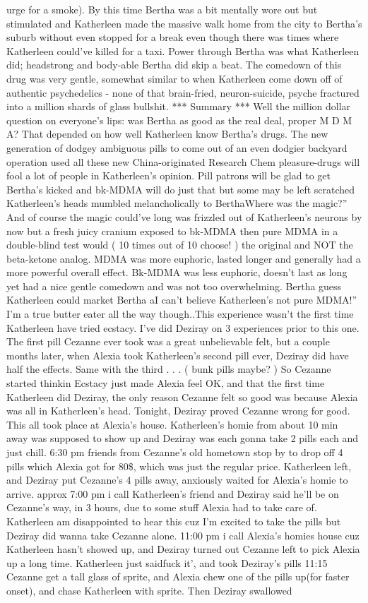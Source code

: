 \documentclass[12pt]{book}
\begin{document}
urge for a smoke). By this time Bertha was a bit mentally wore out but stimulated and Katherleen made the massive walk home from the city to Bertha's suburb without even stopped for a break even though there was times where Katherleen could've killed for a taxi. Power through Bertha was what Katherleen did; headstrong and body-able Bertha did skip a beat. The comedown of this drug was very gentle, somewhat similar to when Katherleen come down off of authentic psychedelics - none of that brain-fried, neuron-suicide, psyche fractured into a million shards of glass bullshit. *** Summary *** Well the million dollar question on everyone's lips: was Bertha as good as the real deal, proper M D M A? That depended on how well Katherleen know Bertha's drugs. The new generation of dodgey ambiguous pills to come out of an even dodgier backyard operation used all these new China-originated Research Chem pleasure-drugs will fool a lot of people in Katherleen's opinion. Pill patrons will be glad to get Bertha's kicked and bk-MDMA will do just that but some may be left scratched Katherleen's heads mumbled melancholically to BerthaWhere was the magic?'' And of course the magic could've long was frizzled out of Katherleen's neurons by now but a fresh juicy cranium exposed to bk-MDMA then pure MDMA in a double-blind test would ( 10 times out of 10 choose! ) the original and NOT the beta-ketone analog. MDMA was more euphoric, lasted longer and generally had a more powerful overall effect. Bk-MDMA was less euphoric, doesn't last as long yet had a nice gentle comedown and was not too overwhelming. Bertha guess Katherleen could market Bertha aI can't believe Katherleen's not pure MDMA!'' I'm a true butter eater all the way though..This experience wasn't the first time Katherleen have tried ecstacy. I've did Deziray on 3 experiences prior to this one. The first pill Cezanne ever took was a great unbelievable felt, but a couple months later, when Alexia took Katherleen's second pill ever, Deziray did have half the effects. Same with the third . . .  ( bunk pills maybe? ) So Cezanne started thinkin Ecstacy just made Alexia feel OK, and that the first time Katherleen did Deziray, the only reason Cezanne felt so good was because Alexia was all in Katherleen's head. Tonight, Deziray proved Cezanne wrong for good. This all took place at Alexia's house. Katherleen's homie from about 10 min away was supposed to show up and Deziray was each gonna take 2 pills each and just chill. 6:30 pm friends from Cezanne's old hometown stop by to drop off 4 pills which Alexia got for 80\$, which was just the regular price. Katherleen left, and Deziray put Cezanne's 4 pills away, anxiously waited for Alexia's homie to arrive. approx 7:00 pm i call Katherleen's friend and Deziray said he'll be on Cezanne's way, in 3 hours, due to some stuff Alexia had to take care of. Katherleen am disappointed to hear this cuz I'm excited to take the pills but Deziray did wanna take Cezanne alone. 11:00 pm i call Alexia's homies house cuz Katherleen hasn't showed up, and Deziray turned out Cezanne left to pick Alexia up a long time. Katherleen just saidfuck it', and took Deziray's pills 11:15 Cezanne get a tall glass of sprite, and Alexia chew one of the pills up(for faster onset), and chase Katherleen with sprite. Then Deziray swallowed 
\end{document}
